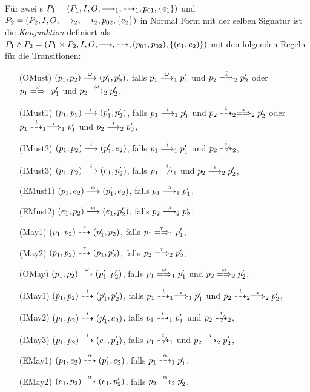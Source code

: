\begin{Def}[Konjunktion]
  Für zwei \MEIO{}s $P_1 = (P_1,I,O,\must _1,\may _1,p_{01},\{e_1\})$ und $P_2
  = (P_2,I,O,\must _2,\may _2,p_{02},\{e_2\})$ in Normal Form mit der selben
  Signatur ist die \emph{Konjunktion} definiert als $P_1\land P_2 =
  (P_1\times P_2, I, O, \must, \may ,(p_{01},p_{02}),\{(e_1,e_2)\})$ mit den
  folgenden Regeln für die Transitionen:
  \begin{itemize}
    \item[(OMust)] $(p_1,p_2) \must[\omega] (p'_1,p'_2)$, falls
      $p_1 \must[\omega]_1 p'_1$ und $p_2 \weakmay[\hat{\omega}]_2 p'_2$ oder
      $p_1 \weakmay[\hat{\omega}]_1 p'_1$ und $p_2 \must[\omega]_2 p'_2$,
    \item[(IMust1)] $(p_1,p_2) \must[i] (p'_1,p'_2)$, falls $p_1 \must[i]_1
      p'_1$ und $p_2 \may[i]_2 \weakmay[\varepsilon]_2 p'_2$ oder $p_1
      \may[i]_1 \weakmay[\varepsilon]_1 p'_1$ und $p_2 \must[i]_2 p'_2$,
    \item[(IMust2)] $(p_1,p_2) \must[i] (p'_1,e_2)$, falls $p_1 \must[i]_1
      p'_1$ und $p_2 \nmay[i]_2$,
    \item[(IMust3)] $(p_1,p_2) \must[i] (e_1,p'_2)$, falls $p_1 \nmay[i]_1$ und
      $p_2 \must[i]_2 p'_2$,
    \item[(EMust1)] $(p_1,e_2) \must[\alpha] (p'_1,e_2)$, falls $p_1
      \must[\alpha]_1 p'_1$,
    \item[(EMust2)] $(e_1,p_2) \must[\alpha] (e_1,p'_2)$, falls $p_2
      \must[\alpha]_2 p'_2$,
    \item[(May1)] $(p_1,p_2) \may[\tau] (p'_1,p_2)$, falls $p_1
      \weakmay[\tau]_1 p'_1$,
    \item[(May2)] $(p_1,p_2) \may[\tau] (p_1,p'_2)$, falls $p_2
      \weakmay[\tau]_2 p'_2$,
    \item[(OMay)] $(p_1,p_2) \may[\omega] (p'_1,p'_2)$, falls $p_1
      \weakmay[\omega]_1 p'_1$ und $p_2 \weakmay[\omega]_2 p'_2$,
    \item[(IMay1)] $(p_1,p_2) \may[i] (p'_1,p'_2)$, falls $p_1 \may[i]_1
      \weakmay[\varepsilon]_1 p'_1$ und $p_2 \may[i]_2 \weakmay[\varepsilon]_2
      p'_2$,
    \item[(IMay2)] $(p_1,p_2) \may[i] (p'_1,e_2)$, falls $p_1 \may[i]_1 p'_1$
      und $p_2 \nmay[i]_2$,
    \item[(IMay3)] $(p_1,p_2) \may[i] (e_1,p'_2)$, falls $p_1 \nmay[i]_1$ und
      $p_2 \may[i]_2 p'_2$,
    \item[(EMay1)] $(p_1,e_2) \may[\alpha] (p'_1,e_2)$, falls $p_1
      \may[\alpha]_1 p'_1$,
    \item[(EMay2)] $(e_1,p_2) \may[\alpha] (e_1,p'_2)$, falls $p_2
      \may[\alpha]_2 p'_2$.
  \end{itemize}
\end{Def}

